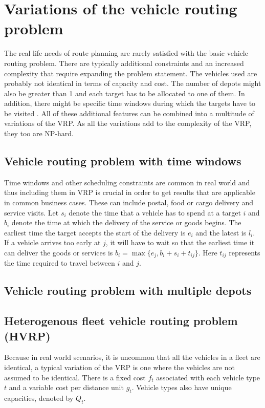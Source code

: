  


\section{Variations of the vehicle routing problem}

The real life needs of route planning are rarely satisfied with the basic vehicle routing problem. There are typically additional constraints and an increased complexity that require expanding the problem statement. The vehicles used are probably not identical in terms of capacity and cost. The number of depots might also be greater than 1 and each target has to be allocated to one of them. \cite{salhi2014multi} In addition, there might be specific time windows during which the targets have to be visited \cite{ghoseiri2010multi}. All of these additional features can be combined into a multitude of variations of the VRP. As all the variations add to the complexity of the VRP, they too are NP-hard.

\subsection{Vehicle routing problem with time windows}

Time windows and other scheduling constraints are common in real world and thus including them in VRP is crucial in order to get results that are applicable in common business cases. These can include postal, food or cargo delivery and service visits. Let $s_i$ denote the time that a vehicle has to spend at a target $i$ and $b_i$ denote the time at which the delivery of the service or goods begins. The earliest time the target accepts the start of the delivery is $e_i$ and the latest is $l_i$. If a vehicle arrives too early at $j$, it will have to wait so that the earliest time it can deliver the goods or services is $b_i = \max\{e_j, b_i + s_i + t_{ij}\}$. Here $t_{ij}$ represents the time required to travel between $i$ and $j$. \cite{solomon1987algorithms}

\subsection{Vehicle routing problem with multiple depots}

\subsection{Heterogenous fleet vehicle routing problem (HVRP)}

Because in real world scenarios, it is uncommon that all the vehicles in a fleet are identical, a typical variation of the VRP is one where the vehicles are not assumed to be identical. There is a fixed cost $f_t$ associated with each vehicle type $t$ and a variable cost per distance unit $g_t$. Vehicle types also have unique capacities, denoted by $Q_t$. \cite{gendreau1999tabu}














